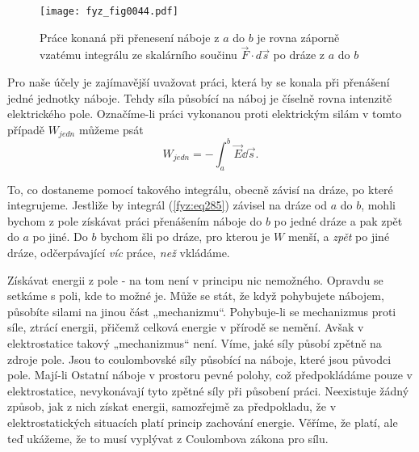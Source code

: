     \begin{figure}[ht!]  %
      \centering
      \texttt{[image: fyz\_fig0044.pdf]}
      \caption{Práce konaná při přenesení náboje z \(a\) do \(b\) je rovna záporně vzatému 
        integrálu ze skalárního součinu \(\vec{F}\cdot d\vec{s}\) po dráze z \(a\) do \(b\)}
      \label{fyz:fig0044}
    \end{figure}    
    Pro naše účely je zajímavější uvažovat práci, která by se konala při přenášení jedné jednotky 
    náboje. Tehdy síla působící na náboj je číselně rovna intenzitě elektrického pole. Označíme-li 
    práci vykonanou proti elektrickým silám v tomto případě \(W_{jedn}\) můžeme psát
    \begin{equation}\label{fyz:eq285}
      W_{jedn} = -\int_{a}^{b}\vec{E}\dd{\vec{s}}.
    \end{equation}
    
    To, co dostaneme pomocí takového integrálu, obecně závisí na dráze, po které integrujeme. 
    Jestliže by integrál (\ref{fyz:eq285}) závisel na dráze od \(a\) do \(b\), mohli 
    bychom z pole získávat práci přenášením náboje do \(b\) po jedné dráze a pak zpět do \(a\) po 
    jiné. Do \(b\) bychom šli po dráze, pro kterou je \(W\) menší, a \emph{zpět} po jiné dráze, 
    odčerpávající \emph{víc} práce, \emph{než} vkládáme.
    
    Získávat energii z pole - na tom není v principu nic nemožného. Opravdu se setkáme s poli, kde 
    to možné je. Může se stát, že když pohybujete nábojem, působíte silami na jinou část 
    „mechanizmu“. Pohybuje-li se mechanizmus proti síle, ztrácí energii, přičemž celková energie v 
    přírodě se nemění. Avšak v elektrostatice takový „mechanizmus“ není. Víme, jaké síly působí 
    zpětně na zdroje pole. Jsou to coulombovské síly působící na náboje, které jsou původci pole. 
    Mají-li Ostatní náboje v prostoru pevné polohy, což předpokládáme pouze v elektrostatice, 
    nevykonávají tyto zpětné síly při působení práci. Neexistuje žádný způsob, jak z nich získat 
    energii, samozřejmě za předpokladu, že v elektrostatických situacích platí princip zachování 
    energie. Věříme, že platí, ale teď ukážeme, že to musí vyplývat z Coulombova zákona pro 
    sílu.         
    
